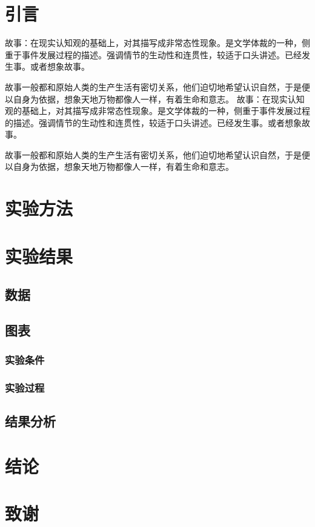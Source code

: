 \documentclass{ctexart} %
\begin{document}
	\section{引言}	
	故事：在现实认知观的基础上，对其描写成非常态性现象。是文学体裁的一种，侧重于事件发展过程的描述。强调情节的生动性和连贯性，较适于口头讲述。已经发生事。或者想象故事。
	
	故事一般都和原始人类的生产生活有密切关系，他们迫切地希望认识自然，于是便以自身为依据，想象天地万物都像人一样，有着生命和意志。			
	故事：在现实认知观的基础上，对其描写成非常态性现象。是文学体裁的一种，侧重于事件发展过程的描述。强调情节的生动性和连贯性，较适于口头讲述。已经发生事。或者想象故事。\par 故事一般都和原始人类的生产生活有密切关系，他们迫切地希望认识自然，于是便以自身为依据，想象天地万物都像人一样，有着生命和意志。
	
	\section{实验方法}	
	\section{实验结果}	
	\subsection{数据}
	\subsection{图表}
	\subsubsection{实验条件}
	\subsubsection{实验过程}
	\subsection{结果分析}
	\section{结论}	
	\section{致谢}	
	
\end{document}
